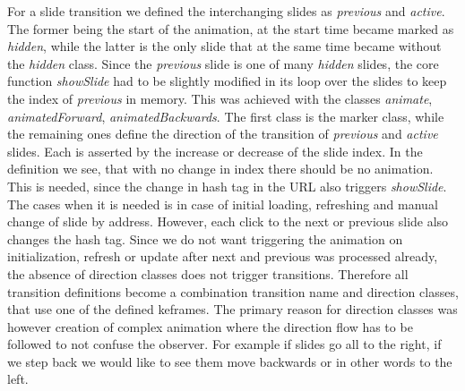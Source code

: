 For a slide transition we defined the interchanging slides as \textit{previous} and \textit{active}. The former being the start of the animation, at the start time became marked as \textit{hidden}, while the latter is the only slide that at the same time became without the \textit{hidden} class. Since the \textit{previous} slide is one of many \textit{hidden} slides, the core function \textit{showSlide} had to be slightly modified in its loop over the slides to keep the index of \textit{previous} in memory. This was achieved with the classes \textit{animate}, \textit{animatedForward}, \textit{animatedBackwards}. The first class is the marker class, while the remaining ones define the direction of the transition of \textit{previous} and \textit{active} slides. Each is asserted by the increase or decrease of the slide index. In the definition we see, that with no change in index there should be no animation. This is needed, since the change in hash tag in the URL also triggers \textit{showSlide}. The cases when it is needed is in case of initial loading, refreshing and manual change of slide by address. However, each click to the next or previous slide also changes the hash tag. Since we do not want triggering the animation on initialization, refresh or update after next and previous was processed already, the absence of direction classes does not trigger transitions. Therefore all transition definitions become a combination transition name and direction classes, that use one of the defined keframes. The primary reason for direction classes was however creation of complex animation where the direction flow has to be followed to not confuse the observer. For example if slides go all to the right, if we step back we would like to see them move backwards or in other words to the left.


